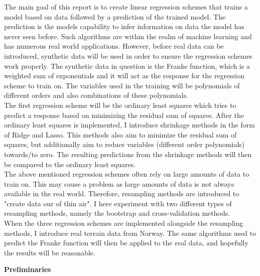 \documentclass[12pt,a4paper]{article}
\begin{document}
\noindent The main goal of this report is to create linear regression schemes that trains a model based on data followed by a prediction of the trained model. The prediction is the models capability to infer information on data the model has never seen before. Such algorithms are within the realm of machine learning and has numerous real world applications. However, before real data can be introduced, synthetic data will be used in order to ensure the regression schemes work properly. The synthetic data in question is the Franke function, which is a weighted sum of exponentials and it will act as the response for the regression scheme to train on. The variables used in the training will be polynomials of different orders and also combinations of these polynomials.
\\
The first regression scheme will be the ordinary least squares which tries to predict a response based on minimizing the residual sum of squares. After the ordinary least squares is implemented, I introduce shrinkage methods in the form of Ridge and Lasso. This methods also aim to minimize the residual sum of squares, but additionally aim to reduce variables (different order polynomials) towards/to zero. The resulting predictions from the shrinkage methods will then be compared to the ordinary least squares. 
\\
The above mentioned regression schemes often rely on large amounts of data to train on. This may cause a problem as large amounts of data is not always available in the real world. Therefore, resampling methods are introduced to "create data our of thin air". I here experiment with two different types of resampling methods, namely the bootstrap and cross-validation methods.
\\
When the three regression schemes are implemented alongside the resampling methods, I introduce real terrain data from Norway. The same algorithms used to predict the Franke function will then be applied to the real data, and hopefully the results will be reasonable.

\newpage

\begin{center}
\Large{\textbf{Preliminaries}}
\end{center}
\end{document}
